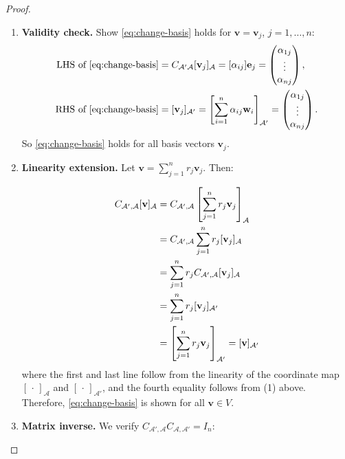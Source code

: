 \begin{proof}
\begin{enumerate}
    \item \textbf{Validity check.} Show \eqref{eq:change-basis} holds for \( \mathbf{v} = \mathbf{v}_j \), \( j = 1, \ldots, n \):
    \begin{align*}
        \text{LHS of \eqref{eq:change-basis}} &= C_{\mathcal{A}'\mathcal{A}} [{\bf v}_j]_{\mathcal{A}} =  [\alpha_{ij}] {\bf e}_j = \begin{pmatrix} \alpha_{1j} \\ \vdots \\ \alpha_{nj} \end{pmatrix}, \\
        \text{RHS of \eqref{eq:change-basis}} &= [\mathbf{v}_j]_{\mathcal{A}'} 
        = \left[ \sum_{i=1}^n \alpha_{ij} \mathbf{w}_i \right]_{\mathcal{A}'} 
        = \begin{pmatrix} \alpha_{1j} \\ \vdots \\ \alpha_{nj} \end{pmatrix}.
    \end{align*}
    So \eqref{eq:change-basis} holds for all basis vectors \( \mathbf{v}_j \).

    \item \textbf{Linearity extension.} Let \( \mathbf{v} = \sum_{j=1}^n r_j \mathbf{v}_j \). Then:

    \begin{align*}
        C_{\mathcal{A}',\mathcal{A}}[\mathbf{v}]_{\mathcal{A}} 
        &= C_{\mathcal{A}',\mathcal{A}} \left[ \sum_{j=1}^n r_j \mathbf{v}_j \right]_{\mathcal{A}}\\
        &= C_{\mathcal{A}',\mathcal{A}} \sum_{j=1}^n r_j [\mathbf{v}_j]_{\mathcal{A}} \\
        &= \sum_{j=1}^n r_j C_{\mathcal{A}',\mathcal{A}} [\mathbf{v}_j]_{\mathcal{A}}  \\
        &= \sum_{j=1}^n r_j [\mathbf{v}_j]_{\mathcal{A}'} \\
        &= \left[ \sum_{j=1}^n r_j \mathbf{v}_j \right]_{\mathcal{A}'} = [\mathbf{v}]_{\mathcal{A}'} \notag
    \end{align*}
     where the first and last line follow from the linearity of the coordinate map \( [\,\cdot\,]_{\mathcal{A}} \) and \( [\,\cdot\,]_{\mathcal{A}'} \), and the fourth equality follows from (1) above. Therefore, \eqref{eq:change-basis} is shown for all \( \mathbf{v} \in V \). 
    \item \textbf{Matrix inverse.} We verify \( C_{\mathcal{A}',\mathcal{A}} C_{\mathcal{A},\mathcal{A}'} = I_n \):


\end{enumerate}
\end{proof}
